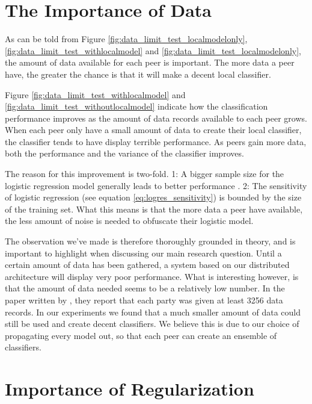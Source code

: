 \section{The Importance of Data} \label{importance_of_data}
As can be told from Figure \ref{fig:data_limit_test_localmodelonly}, \ref{fig:data_limit_test_withlocalmodel} and \ref{fig:data_limit_test_localmodelonly}, the amount of data available for each peer is important. The more data a peer have, the greater the chance is that it will make a decent local classifier. 

Figure \ref{fig:data_limit_test_withlocalmodel} and \ref{fig:data_limit_test_withoutlocalmodel} indicate how the classification performance improves as the amount of data records available to each peer grows. When each peer only have a small amount of data to create their local classifier, the classifier tends to have display terrible performance. As peers gain more data, both the performance and the variance of the classifier improves.     

The reason for this improvement is two-fold. 1: A bigger sample size for the logistic regression model generally leads to better performance \cite{peduzzi1996simulation}. 2: The sensitivity of logistic regression (see equation \ref{eq:logres_sensitivity}) is bounded by the size of the training set. What this means is that the more data a peer have available, the less amount of noise is needed to obfuscate their logistic model. 

The observation we've made is therefore thoroughly grounded in theory, and is important to highlight when discussing our main research question. Until a certain amount of data has been gathered, a system based on our distributed architecture will display very poor performance. What is interesting however, is that the amount of data needed seems to be a relatively low number. In the paper written by \cite{pathak2010diffprivhomo}, they report that each party was given at least 3256 data records. In our experiments we found that a much smaller amount of data could still be used and create decent classifiers. We believe this is due to our choice of propagating every model out, so that each peer can create an ensemble of classifiers.   	  	

\section{Importance of Regularization}

